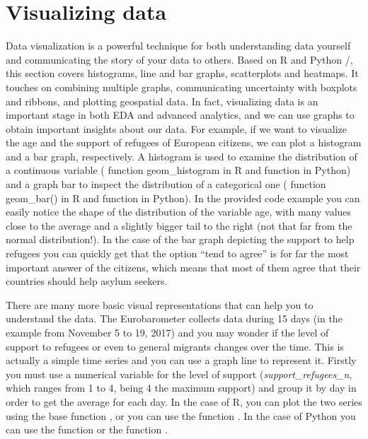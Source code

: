 \section{Visualizing data}
\label{sec:visualization}


Data visualization is a powerful technique for both understanding data yourself and communicating the story of your data to others. Based on R  and Python /, this section covers histograms, line and bar graphs, scatterplots and heatmaps. It touches on combining multiple graphs, communicating uncertainty with boxplots and ribbons, and plotting geospatial data.  In fact, visualizing data is an important stage in both EDA and advanced analytics, and we can use graphs to obtain important insights about our data. For example, if we want to visualize the age and the support of refugees of European citizens, we can plot a histogram and a bar graph, respectively. A histogram is used to examine the distribution of a continuous variable ( function geom\_histogram in R and  function  in Python) and a graph bar to inspect the distribution of a categorical one ( function geom\_bar() in R and  function  in Python). In the provided code example you can easily notice the shape of the distribution of the variable age, with many values close to the average and a slightly bigger tail to the right (not that far from the normal distribution!).  In the case of the bar graph depicting the support to help refugees you can quickly get that the option “tend to agree” is for far the most important answer of the citizens, which means that most of them agree that their countries should help asylum seekers.


There are many more basic visual representations that can help you to understand the data. The Eurobarometer collects data during 15 days (in the example from November 5 to 19, 2017) and you may wonder if the level of support to refugees or even to general migrants changes over the time. This is actually a simple time series and you can use a graph line to represent it. Firstly you must use a numerical variable for the level of support (\emph{support\_refugees\_n}, which ranges from 1 to 4, being 4 the maximum support) and group it by day in order to get the average for each day. In the case of R, you can plot the two series using the base function , or you can use the  function . In the case of Python you can use the  function  or the  function .	

